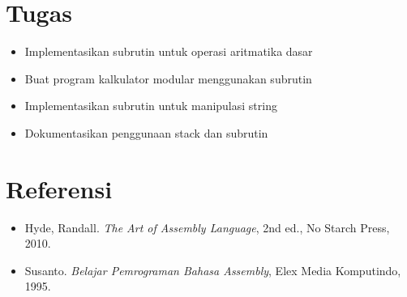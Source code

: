 \section{Tugas}
\begin{itemize}
\item Implementasikan subrutin untuk operasi aritmatika dasar
\item Buat program kalkulator modular menggunakan subrutin
\item Implementasikan subrutin untuk manipulasi string
\item Dokumentasikan penggunaan stack dan subrutin
\end{itemize}

\section{Referensi}
\begin{itemize}
\item Hyde, Randall. \textit{The Art of Assembly Language}, 2nd ed., No Starch Press, 2010.
\item Susanto. \textit{Belajar Pemrograman Bahasa Assembly}, Elex Media Komputindo, 1995.
\end{itemize}

